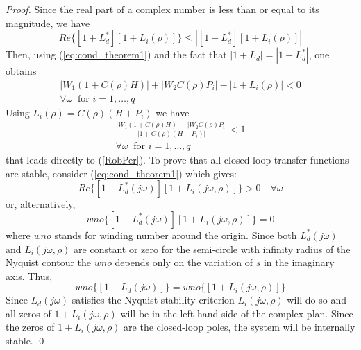 \documentclass[default]{svmult}
\begin{document}
\begin{proof} 
\smartqed
Since the real part of a complex number is less than or equal to its magnitude, we have
\begin{equation} \label{UpperBound}
Re\{[1+L^{\ast}_d][1+L_{i}(\rho)]\}\leq |[1+L^{\ast}_d][1+L_{i}(\rho)]|
\end{equation}
Then, using (\ref{eq:cond_theorem1}) and the fact that $|1+L_d|=|1+L^*_d|$, one obtains 				
\begin{eqnarray}
\big|W_{1}(1+C(\rho)H)\big| + \big | W_{2}C(\rho)P_i \big| - 
|1+L_i(\rho)|<0 \nonumber\\
 \forall \omega \: \mbox{ for }i=1,\ldots,q 
\end{eqnarray}
Using $L_i(\rho)=C(\rho)(H+P_i)$ we have 
\begin{eqnarray}\label{eq:siso_rob}
\frac{|W_{1}(1+C(\rho)H)| + |W_{2}C(\rho)P_i | }{|1+C(\rho)(H+P_i)|} <1 \nonumber\\
 \forall \omega \: \mbox{ for }i=1,\ldots,q  
\end{eqnarray}
that leads directly to (\ref{RobPer}).
To prove that all  closed-loop transfer functions are stable, consider (\ref{eq:cond_theorem1})  which gives:
\begin{equation}
Re\{[1+L^{\ast}_d(j\omega)][1+L_i(j\omega,\rho)]\}>0 \quad \forall \omega
\end{equation}
or, alternatively, 
\begin{equation}
wno\{[1+L^{\ast}_d(j\omega)][1+L_i(j\omega,\rho)] \}=0
\end{equation}
where $wno$ stands for winding number around the origin. Since both $L^{\ast}_d(j\omega)$ and $L_i(j\omega,\rho)$ are constant or zero for the semi-circle with infinity radius of the Nyquist contour 
the $wno$ depends only on the variation of $s$ in the imaginary axis. Thus,
\begin{equation}
wno\{[1+L_d(j\omega)]\}  =wno\{[1+L_i(j\omega,\rho)] \}
\end{equation}
Since $L_d(j\omega)$ satisfies the Nyquist stability criterion $L_i(j\omega,\rho)$ will do so and 
all zeros of $1+L_i(j\omega,\rho)$ will be in the left-hand side of the complex plan. Since the zeros of
$1+L_i(j\omega,\rho)$ are the closed-loop poles, the system will be internally stable.
\qed
\end{proof}
\end{document}
